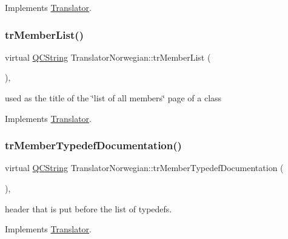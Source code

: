 Implements \mbox{\hyperlink{class_translator}{Translator}}.

\mbox{\label{class_translator_norwegian_a63b0bd2d8dd35d4f10c3240efecebbd7}} 
\subsubsection{\texorpdfstring{trMemberList()}{trMemberList()}}
{\footnotesize\ttfamily virtual \mbox{\hyperlink{class_q_c_string}{Q\+C\+String}} Translator\+Norwegian\+::tr\+Member\+List (\begin{DoxyParamCaption}{ }\end{DoxyParamCaption})\hspace{0.3cm}{\ttfamily [inline]}, {\ttfamily [virtual]}}

used as the title of the \char`\"{}list of all members\char`\"{} page of a class 

Implements \mbox{\hyperlink{class_translator}{Translator}}.

\mbox{\label{class_translator_norwegian_a6a59c9fad41ff6b4a1cc04fe035c31b3}} 
\subsubsection{\texorpdfstring{trMemberTypedefDocumentation()}{trMemberTypedefDocumentation()}}
{\footnotesize\ttfamily virtual \mbox{\hyperlink{class_q_c_string}{Q\+C\+String}} Translator\+Norwegian\+::tr\+Member\+Typedef\+Documentation (\begin{DoxyParamCaption}{ }\end{DoxyParamCaption})\hspace{0.3cm}{\ttfamily [inline]}, {\ttfamily [virtual]}}

header that is put before the list of typedefs. 

Implements \mbox{\hyperlink{class_translator}{Translator}}.

\mbox{\label{class_translator_norwegian_a28824c22c658ed3f6d166de628d202c1}} 
